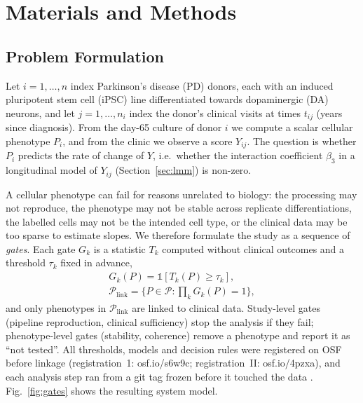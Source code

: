 
\section{\textbf{Materials and Methods}}\label{sec:methods}

\subsection{\textbf{Problem Formulation}}\label{sec:formulation}
Let $i = 1,\dots,n$ index Parkinson's disease (PD) donors, each with an induced pluripotent stem
cell (iPSC) line differentiated towards dopaminergic (DA) neurons, and let $j = 1,\dots,n_i$ index
the donor's clinical visits at times $t_{ij}$ (years since diagnosis). From the day-65 culture of
donor $i$ we compute a scalar cellular phenotype $P_i$, and from the clinic we observe a score
$Y_{ij}$. The question is whether $P_i$ predicts the rate of change of $Y$, i.e.\ whether the
interaction coefficient $\beta_3$ in a longitudinal model of $Y_{ij}$ (Section~\ref{sec:lmm}) is
non-zero.

A cellular phenotype can fail for reasons unrelated to biology: the processing may not reproduce,
the phenotype may not be stable across replicate differentiations, the labelled cells may not be
the intended cell type, or the clinical data may be too sparse to estimate slopes. We therefore
formulate the study as a sequence of \emph{gates}. Each gate $G_k$ is a statistic $T_k$ computed
without clinical outcomes and a threshold $\tau_k$ fixed in advance,
\begin{gather}
G_k(P) = \mathbb{1}\!\left[T_k(P) \ge \tau_k\right],
\label{eq:gates}\\
\mathcal{P}_{\mathrm{link}} = \Big\{P \in \mathcal{P} : \textstyle\prod_k G_k(P) = 1\Big\},
\label{eq:linkset}
\end{gather}
and only phenotypes in $\mathcal{P}_{\mathrm{link}}$ are linked to clinical data. Study-level
gates (pipeline reproduction, clinical sufficiency) stop the analysis if they fail; phenotype-level
gates (stability, coherence) remove a phenotype and report it as ``not tested''. All thresholds,
models and decision rules were registered on OSF before linkage (registration~1:
osf.io/s6w9c; registration~II: osf.io/4pzxa), and each analysis step ran from a git tag frozen
before it touched the data \cite{nosek2018prereg}. Fig.~\ref{fig:gates} shows the resulting system model.

